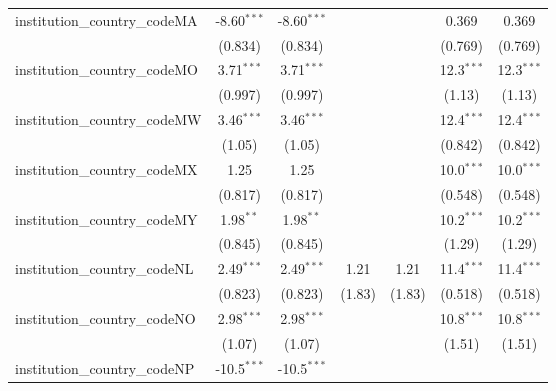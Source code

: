 \begin{tabular}{lcccccc}
   institution\_country\_codeMA          & -8.60$^{***}$  & -8.60$^{***}$  &               &               & 0.369         & 0.369\\   
                                         & (0.834)        & (0.834)        &               &               & (0.769)       & (0.769)\\   
   institution\_country\_codeMO          & 3.71$^{***}$   & 3.71$^{***}$   &               &               & 12.3$^{***}$  & 12.3$^{***}$\\   
                                         & (0.997)        & (0.997)        &               &               & (1.13)        & (1.13)\\   
   institution\_country\_codeMW          & 3.46$^{***}$   & 3.46$^{***}$   &               &               & 12.4$^{***}$  & 12.4$^{***}$\\   
                                         & (1.05)         & (1.05)         &               &               & (0.842)       & (0.842)\\   
   institution\_country\_codeMX          & 1.25           & 1.25           &               &               & 10.0$^{***}$  & 10.0$^{***}$\\   
                                         & (0.817)        & (0.817)        &               &               & (0.548)       & (0.548)\\   
   institution\_country\_codeMY          & 1.98$^{**}$    & 1.98$^{**}$    &               &               & 10.2$^{***}$  & 10.2$^{***}$\\   
                                         & (0.845)        & (0.845)        &               &               & (1.29)        & (1.29)\\   
   institution\_country\_codeNL          & 2.49$^{***}$   & 2.49$^{***}$   & 1.21          & 1.21          & 11.4$^{***}$  & 11.4$^{***}$\\   
                                         & (0.823)        & (0.823)        & (1.83)        & (1.83)        & (0.518)       & (0.518)\\   
   institution\_country\_codeNO          & 2.98$^{***}$   & 2.98$^{***}$   &               &               & 10.8$^{***}$  & 10.8$^{***}$\\   
                                         & (1.07)         & (1.07)         &               &               & (1.51)        & (1.51)\\   
   institution\_country\_codeNP          & -10.5$^{***}$  & -10.5$^{***}$  &               &               &               &   \\   

\end{tabular}
